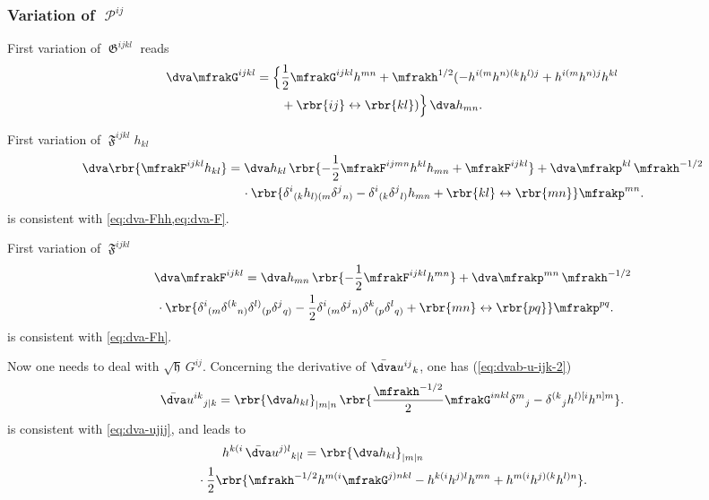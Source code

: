 \documentclass[a4paper,11pt]{article}
\begin{document}
\subsubsection{Variation of \texorpdfstring{$\mscrP^{ij}$}{$P^{ij}$}}


First variation of $\mfrakG^{ijkl}$ reads
\begin{align}
\dva \mfrakG^{ijkl} &= \Big\{\frac{1}{2}\mfrakG^{ijkl}h^{mn}
+ \mfrakh^{1/2}(-h^{i(m}h^{n)(k}h^{l)j} + h^{i(m}h^{n)j}h^{kl}
\nonumber \\
&\qquad+
\rbr{ij} \leftrightarrow \rbr{kl} ) \Big\} \,\dva h_{mn}.
\end{align}

First variation of $\mfrakF^{ijkl}h_{kl}$
\begin{align}
\dva\rbr{\mfrakF^{ijkl}h_{kl}} &= \dva h_{kl}\,
\rbr{-\frac{1}{2}\mfrakF^{ijmn}h^{kl}h_{mn}+\mfrakF^{ijkl}}
+
\dva \mfrakp^{kl} \, \mfrakh^{-1/2}
\nonumber \\
&\quad\,\cdot
\rbr{\delta^{i}{}_{(k}h_{l)(m}\delta^{j}{}_{n)}-
\delta^{i}{}_{(k}\delta^{j}{}_{l)}h_{mn} 
+ \rbr{kl}\leftrightarrow\rbr{mn}}
\mfrakp^{mn}.
\label{eq:dva-Fh}
\end{align}
 is consistent with \cref{eq:dva-Fhh,eq:dva-F}.

First variation of $\mfrakF^{ijkl}$
\begin{align}
&\dva\mfrakF^{ijkl} = \dva h_{mn}\,\rbr{-\frac{1}{2}\mfrakF^{ijkl}h^{mn}}
+\dva\mfrakp^{mn}\,\mfrakh^{-1/2}
\nonumber \\
&\,\cdot \rbr{
\delta^{i}{}_{(m} \delta^{(k}{}_{n)} \delta^{l)}{}_{(p} \delta^{j}{}_{q)} -
\frac{1}{2}
\delta^{i}{}_{(m} \delta^{j}{}_{n)} \delta^{k}{}_{(p} \delta^{l}{}_{q)}
+\rbr{mn}\leftrightarrow\rbr{pq}}\mfrakp^{pq}.
\label{eq:dva-F}
\end{align}
 is consistent with \cref{eq:dva-Fh}.

Now one needs to deal with $\sqrt{\mfrakh}\,G^{ij}$. Concerning the derivative 
of $\bar{\dva}u^{ij}{}_k$, one has (\cref{eq:dvab-u-ijk-2})
\begin{align}
\bar{\dva}u^{ik}{}_{j|k} =
\rbr{\dva h_{kl}}_{|m|n}\,
\rbr{\frac{\mfrakh^{-1/2}}{2} \mfrakG^{inkl} \delta^m{}_j
- \delta^{(k}{}_{j}h^{l)[i}h^{n]m}}.
\label{eq:dva-uikj|k}
\end{align}
 is consistent with \cref{eq:dva-ujij}, and leads to
\begin{align}
&\qquad
h^{k(i}\,\bar{\dva}u^{j)l}{}_{k|l} =
\rbr{\dva h_{kl}}_{|m|n}
\nonumber \\
&\cdot
\frac{1}{2}\rbr{ \mfrakh^{-1/2} h^{m(i}\mfrakG^{j)nkl}
- h^{k(i}h^{j)l}h^{mn} + h^{m(i}h^{j)(k}h^{l)n}}.
\label{eq:hki-dva-ujlk|l}
\end{align}
\end{document}
